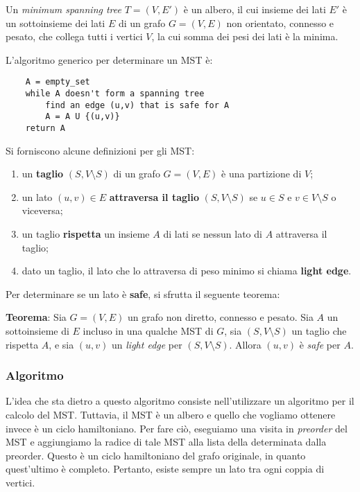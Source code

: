 Un \textit{minimum spanning tree} $T = (V, E')$ è un albero, il cui insieme dei lati $E'$ è un
sottoinsieme dei lati $E$ di un grafo $G = (V, E)$ non orientato, connesso e
pesato, che collega tutti i vertici $V$, la cui somma dei pesi dei lati è la minima.

L'algoritmo generico per determinare un MST è:
\begin{verbatim}
    A = empty_set
    while A doesn't form a spanning tree
        find an edge (u,v) that is safe for A
        A = A U {(u,v)}
    return A
\end{verbatim}

Si forniscono alcune definizioni per gli MST:
\begin{enumerate}
    \item un \textbf{taglio} $(S, V \setminus S)$ di un grafo $G = (V, E)$ è una partizione
    di $V$;
    \item un lato $(u, v) \in E$ \textbf{attraversa il taglio} $(S, V \setminus S)$ se
    $u \in S$ e $v \in V \setminus S$ o viceversa;
    \item un taglio \textbf{rispetta} un insieme $A$ di lati se nessun lato di $A$ attraversa
    il taglio;
    \item dato un taglio, il lato che lo attraversa di peso minimo si chiama \textbf{light edge}.
\end{enumerate}

Per determinare se un lato è \textbf{safe}, si sfrutta il seguente teorema:

\textbf{Teorema}: Sia $G = (V, E)$ un grafo non diretto, connesso e pesato. Sia $A$ un
sottoinsieme di $E$ incluso in una qualche MST di $G$, sia $(S, V \setminus S)$ un
taglio che rispetta $A$, e sia $(u, v)$ un \textit{light edge} per $(S, V \setminus S)$.
Allora $(u, v)$ è \textit{safe} per $A$.

\subsubsection{Algoritmo}

L'idea che sta dietro a questo algoritmo consiste nell'utilizzare un algoritmo per il calcolo
del MST. Tuttavia, il MST è un albero e quello che vogliamo ottenere invece è un
ciclo hamiltoniano. Per fare ciò, eseguiamo una visita in \textit{preorder} del MST
e aggiungiamo la radice di tale MST alla lista della determinata dalla preorder. Questo è un ciclo
hamiltoniano del grafo originale, in quanto quest'ultimo è completo. Pertanto, esiste sempre un
lato tra ogni coppia di vertici.

